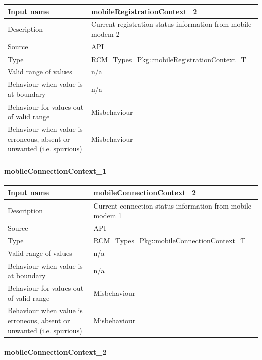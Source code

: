 \begin{longtable}{p{}p{}}
	\toprule
	Input name				& mobileRegistrationContext\_2 \\
	\midrule
	Description				& Current registration status information from mobile modem 2 \\
	\midrule
	Source					& API \\ 
	\midrule
	Type					& RCM\_Types\_Pkg::mobileRegistrationContext\_T \\
	\midrule
	Valid range of values	& n/a \\
	\midrule
	Behaviour when value is at boundary	& n/a \\
	\midrule
	Behaviour for values out of valid range	& Misbehaviour \\
	\midrule
	Behaviour when value is erroneous, absent or unwanted (i.e. spurious) & Misbehaviour \\
	\bottomrule
\end{longtable}

\paragraph{mobileConnectionContext\_1}

\begin{longtable}{p{}p{}}
	\toprule
	Input name				& mobileConnectionContext\_2 \\
	\midrule
	Description				& Current connection status information from mobile modem 1 \\
	\midrule
	Source					& API \\ 
	\midrule
	Type					& RCM\_Types\_Pkg::mobileConnectionContext\_T \\
	\midrule
	Valid range of values	& n/a \\
	\midrule
	Behaviour when value is at boundary	& n/a \\
	\midrule
	Behaviour for values out of valid range	& Misbehaviour \\
	\midrule
	Behaviour when value is erroneous, absent or unwanted (i.e. spurious) & Misbehaviour \\
	\bottomrule
\end{longtable}

\paragraph{mobileConnectionContext\_2}

